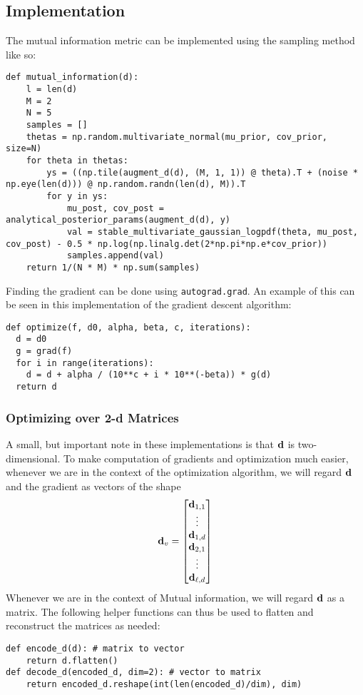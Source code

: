 \subsection{Implementation}
The mutual information metric can be implemented using the sampling method like so:
\begin{verbatim}
def mutual_information(d):
    l = len(d)
    M = 2
    N = 5
    samples = []
    thetas = np.random.multivariate_normal(mu_prior, cov_prior, size=N)
    for theta in thetas:
        ys = ((np.tile(augment_d(d), (M, 1, 1)) @ theta).T + (noise * np.eye(len(d))) @ np.random.randn(len(d), M)).T
        for y in ys:
            mu_post, cov_post = analytical_posterior_params(augment_d(d), y)
            val = stable_multivariate_gaussian_logpdf(theta, mu_post, cov_post) - 0.5 * np.log(np.linalg.det(2*np.pi*np.e*cov_prior))
            samples.append(val)
    return 1/(N * M) * np.sum(samples)
\end{verbatim}

Finding the gradient can be done using \texttt{autograd.grad}. 
An example of this can be seen in this implementation of the gradient descent algorithm:
\begin{verbatim}
def optimize(f, d0, alpha, beta, c, iterations):
  d = d0
  g = grad(f)
  for i in range(iterations):
    d = d + alpha / (10**c + i * 10**(-beta)) * g(d)
  return d
\end{verbatim}

\subsubsection{Optimizing over 2-d Matrices}
A small, but important note in these implementations is that $\mathbf{d}$ is two-dimensional.
To make computation of gradients and optimization much easier, whenever we are in the context of the optimization algorithm, we will regard $\mathbf{d}$ and the gradient as vectors of the shape
$$\mathbf{d}_v = \begin{bmatrix}\mathbf{d}_{1,1} \\ \vdots  \\ \mathbf{d}_{1,d} \\ \mathbf{d}_{2,1} \\ \vdots \\ \mathbf{d}_{\ell, d} \end{bmatrix}$$
Whenever we are in the context of Mutual information, we will regard $\mathbf{d}$ as a matrix. The following helper functions can thus be used to flatten and reconstruct the matrices as needed:
\begin{verbatim}
def encode_d(d): # matrix to vector
    return d.flatten()
def decode_d(encoded_d, dim=2): # vector to matrix
    return encoded_d.reshape(int(len(encoded_d)/dim), dim)
\end{verbatim}


